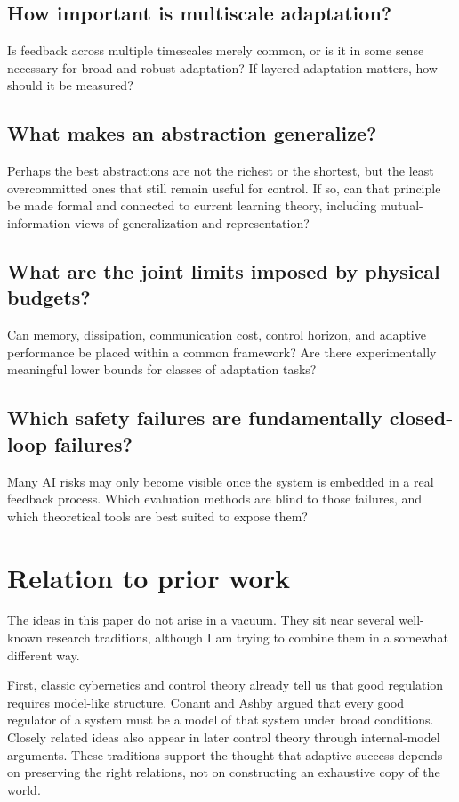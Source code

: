 \documentclass[11pt]{article}
\begin{document}
\subsection{How important is multiscale adaptation?}

Is feedback across multiple timescales merely common, or is it in some sense necessary for broad and robust adaptation? If layered adaptation matters, how should it be measured?

\subsection{What makes an abstraction generalize?}

Perhaps the best abstractions are not the richest or the shortest, but the least overcommitted ones that still remain useful for control. If so, can that principle be made formal and connected to current learning theory, including mutual-information views of generalization and representation?

\subsection{What are the joint limits imposed by physical budgets?}

Can memory, dissipation, communication cost, control horizon, and adaptive performance be placed within a common framework? Are there experimentally meaningful lower bounds for classes of adaptation tasks?

\subsection{Which safety failures are fundamentally closed-loop failures?}

Many AI risks may only become visible once the system is embedded in a real feedback process. Which evaluation methods are blind to those failures, and which theoretical tools are best suited to expose them?

\section{Relation to prior work}

The ideas in this paper do not arise in a vacuum. They sit near several well-known research traditions, although I am trying to combine them in a somewhat different way.

First, classic cybernetics and control theory already tell us that good regulation requires model-like structure. Conant and Ashby argued that every good regulator of a system must be a model of that system under broad conditions. Closely related ideas also appear in later control theory through internal-model arguments. These traditions support the thought that adaptive success depends on preserving the right relations, not on constructing an exhaustive copy of the world.
\end{document}
